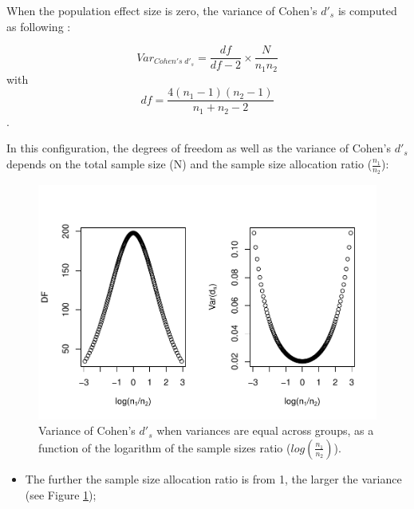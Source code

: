 \documentclass[
  man]{apa6}
\providecommand{\tightlist}{%
  \setlength{\itemsep}{0pt}\setlength{\parskip}{0pt}}
\begin{document}
When the population effect size is zero, the variance of Cohen's \(d'_s\) is computed as following :

\[Var_{Cohen's \; d'_s} = \frac{df}{df-2} \times \frac{N}{n_1n_2}\]
with \[df = \frac{4(n_1-1)(n_2-1)}{n_1+n_2-2}\].

In this configuration, the degrees of freedom as well as the variance of Cohen's \(d'_s\) depends on the total sample size (N) and the sample size allocation ratio (\(\frac{n_1}{n_2}\)):

\begin{figure}
\centering
\includegraphics{Theoretical-Variance-of-all-estimators-as-a-function-of-population-parameters_files/figure-latex/varcohendprimeHomNratio2-1.pdf}
\caption{\label{fig:varcohendprimeHomNratio2}Variance of Cohen's \(d'_s\) when variances are equal across groups, as a function of the logarithm of the sample sizes ratio (\(log\left(\frac{n_1}{n_2} \right)\)).}
\end{figure}

\begin{itemize}
\tightlist
\item
  The further the sample size allocation ratio is from 1, the larger the variance (see Figure \ref{fig:varcohendprimeHomNratio2});
\end{itemize}
\end{document}
